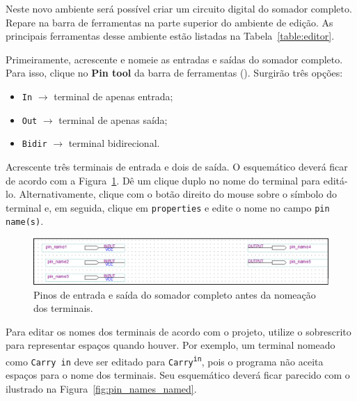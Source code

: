 \documentclass[12pt,a4paper]{article}
\begin{document}
\vspace{12pt}

Neste novo ambiente será possível criar um circuito digital do somador completo. Repare na barra de ferramentas na parte superior do ambiente de edição. As principais ferramentas desse ambiente estão listadas na Tabela~\ref{table:editor}.

Primeiramente, acrescente e nomeie as entradas e saídas do somador completo. Para isso, clique no \textbf{Pin tool} da barra de ferramentas (). Surgirão três opções:

\begin{itemize}
    \item \texttt{In} $\rightarrow$ terminal de apenas entrada;
    \item \texttt{Out} $\rightarrow$ terminal de apenas saída;
    \item \texttt{Bidir} $\rightarrow$ terminal bidirecional.
\end{itemize}

Acrescente três terminais de entrada e dois de saída. O esquemático deverá ficar de acordo com a Figura~\ref{fig:pin_names}. Dê um clique duplo no nome do terminal para editá-lo. Alternativamente, clique com o botão direito do mouse sobre o símbolo do terminal e, em seguida, clique em \texttt{properties} e edite o nome no campo \texttt{pin name(s)}.


\begin{figure}[htbp!]
    \centering
    \includegraphics[width=\textwidth]{./figs/pin_names.png}
    \caption{Pinos de entrada e saída do somador completo antes da nomeação dos terminais.}
    \label{fig:pin_names}
\end{figure}

Para editar os nomes dos terminais de acordo com o projeto, utilize o sobrescrito para representar espaços quando houver. Por exemplo, um terminal nomeado como \texttt{Carry in} deve ser editado para \texttt{Carry\textsuperscript{in}}, pois o programa não aceita espaços para o nome dos terminais. Seu esquemático deverá ficar parecido com o ilustrado na Figura~\ref{fig:pin_names_named}.
\end{document}
